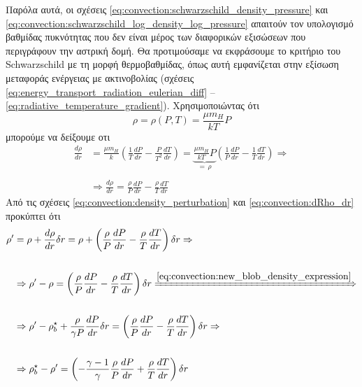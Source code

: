 Παρόλα αυτά, οι σχέσεις \eqref{eq:convection:schwarzschild_density_pressure} και \eqref{eq:convection:schwarzschild_log_density_log_pressure} απαιτούν τον υπολογισμό βαθμίδας πυκνότητας που δεν είναι μέρος των διαφορικών εξισώσεων που περιγράφουν την αστρική δομή. Θα προτιμούσαμε να εκφράσουμε το κριτήριο του Schwarzschild με τη μορφή θερμοβαθμίδας, όπως αυτή εμφανίζεται στην εξίσωση μεταφοράς ενέργειας με ακτινοβολίας (σχέσεις \ref{eq:energy_transport_radiation_eulerian_diff} -- \ref{eq:radiative_temperature_gradient}).
Χρησιμοποιώντας ότι 
\begin{equation*}
    \rho = \rho(P,T) = \frac{\mu m_H}{kT}P
\end{equation*}
μπορούμε να δείξουμε οτι
\begin{align}
    \label{eq:convection:dRho_dr}
    \nonumber \frac{d\rho}{dr} &= \frac{\mu m_H}{k} \left(\frac{1}{T} \frac{dP}{dr} - \frac{P}{T^2}\frac{dT}{dr} \right) = \underbrace{\frac{\mu m_H}{kT}P}_{= \,\rho} \left(\frac{1}{P} \frac{dP}{dr} - \frac{1}{T} \frac{dT}{dr} \right) \Rightarrow \\\nonumber\\
    &\Rightarrow \frac{d\rho}{dr} = \frac{\rho}{P} \frac{dP}{dr} - \frac{\rho}{T} \frac{dT}{dr}
\end{align}
Από τις σχέσεις \eqref{eq:convection:density_perturbation} και \eqref{eq:convection:dRho_dr} προκύπτει ότι
\begin{align*}
    \rho^{\prime} &= \rho + \frac{d\rho}{dr} \delta r = \rho + \left(\frac{\rho}{P} \frac{dP}{dr} - \frac{\rho}{T} \frac{dT}{dr} \right)\delta r \Rightarrow \\\\
    &\Rightarrow \rho^{\prime} - \rho = \left(\frac{\rho}{P} \frac{dP}{dr} - \frac{\rho}{T} \frac{dT}{dr} \right)\delta r \xRightarrow{\eqref{eq:convection:new_blob_density_expression}} \\\\
    &\Rightarrow \rho^{\prime} - \rho_b^{\star} + \frac{\rho}{\gamma P} \frac{dP}{dr} \delta r = \left(\frac{\rho}{P} \frac{dP}{dr} - \frac{\rho}{T} \frac{dT}{dr} \right)\delta r \Rightarrow \\\\
    &\Rightarrow \rho_b^{\star} - \rho^{\prime} = \left(- \frac{\gamma - 1}{\gamma}\frac{\rho}{P} \frac{dP}{dr} + \frac{\rho}{T} \frac{dT}{dr} \right)\delta r
\end{align*}

